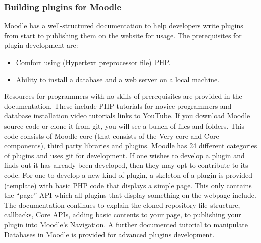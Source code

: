 \documentclass[12pt]{article}
\begin{document}
		\subsubsection{Building plugins for Moodle}
		Moodle has a well-structured documentation to help developers write plugins from start to publishing them on the 			website for usage. The prerequisites for plugin development are: -
		\begin{itemize}
			\item  Comfort using (Hypertext preprocessor file) PHP.
			\item  Ability to install a database and a web server on a local machine.
		\end{itemize}
		 Resources for programmers with no skills of prerequisites are provided in the documentation. These include PHP 				tutorials for novice programmers and database installation video tutorials links to YouTube.
		 If you download Moodle source code or clone it from git, you will see a bunch of files and folders. This code 				consists of Moodle core (that consists of the Very core and Core components), third party libraries and plugins.  			Moodle has 24 different categories of plugins\cite{moodle} and uses git for development. If one wishes to develop a plugin and 			finds out it has already been developed, then they may opt to contribute to its code. For one to develop a new kind 		of plugin, a skeleton of a plugin is provided (template) with basic PHP code that displays a simple page. This only 				contains the “page” API which all plugins that display something on the webpage include. The documentation 				continues to explain the cloned repository file structure, callbacks, Core APIs, adding basic contents to your page, 			to publishing your plugin into Moodle’s Navigation. A further documented tutorial to manipulate Databases in Moodle 		is provided for advanced plugins development.
\end{document}
